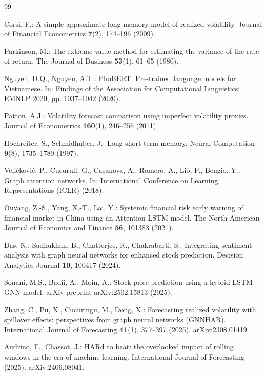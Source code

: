 \documentclass[runningheads]{llncs}
\begin{document}
%
%
\begin{thebibliography}{99}

Corsi, F.: A simple approximate long-memory model of realized volatility.
Journal of Financial Econometrics \textbf{7}(2), 174--196 (2009).

Parkinson, M.: The extreme value method for estimating the variance of the rate of return.
The Journal of Business \textbf{53}(1), 61--65 (1980).

Nguyen, D.Q., Nguyen, A.T.: PhoBERT: Pre-trained language models for Vietnamese.
In: Findings of the Association for Computational Linguistics: EMNLP 2020, pp. 1037--1042 (2020).

Patton, A.J.: Volatility forecast comparison using imperfect volatility proxies.
Journal of Econometrics \textbf{160}(1), 246--256 (2011).

Hochreiter, S., Schmidhuber, J.: Long short-term memory. Neural Computation \textbf{9}(8), 1735--1780 (1997).

Veli\v{c}kovi\'c, P., Cucurull, G., Casanova, A., Romero, A., Li\`o, P., Bengio, Y.:
Graph attention networks. In: International Conference on Learning Representations (ICLR) (2018).

Ouyang, Z.-S., Yang, X.-T., Lai, Y.: Systemic financial risk early warning of financial market in China
using an Attention-LSTM model. The North American Journal of Economics and Finance \textbf{56}, 101383 (2021).

Das, N., Sadhukhan, B., Chatterjee, R., Chakrabarti, S.: Integrating sentiment analysis with graph neural
networks for enhanced stock prediction. Decision Analytics Journal \textbf{10}, 100417 (2024).

Sonani, M.S., Badii, A., Moin, A.: Stock price prediction using a hybrid LSTM-GNN model.
arXiv preprint arXiv:2502.15813 (2025).

Zhang, C., Pu, X., Cucuringu, M., Dong, X.: Forecasting realized volatility with spillover effects:
perspectives from graph neural networks (GNNHAR).
International Journal of Forecasting \textbf{41}(1), 377--397 (2025). arXiv:2308.01419.

Audrino, F., Chassot, J.: HARd to beat: the overlooked impact of rolling windows in the era of machine
learning. International Journal of Forecasting (2025). arXiv:2406.08041.


\end{thebibliography}
\end{document}
